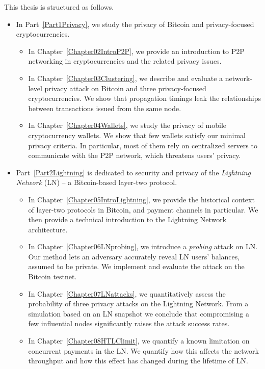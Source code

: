 This thesis is structured as follows.

\begin{itemize}
	\item 
	In Part~\ref{Part1Privacy}, we study the privacy of Bitcoin and privacy-focused cryptocurrencies.
	\begin{itemize}
		\item
	In Chapter~\ref{Chapter02IntroP2P}, we provide an introduction to P2P networking in cryptocurrencies and the related privacy issues.
		\item
	In Chapter~\ref{Chapter03Clustering}, we describe and evaluate a network-level privacy attack on Bitcoin and three privacy-focused cryptocurrencies.
	We show that propagation timings leak the relationships between transactions issued from the same node.
		\item
	In Chapter~\ref{Chapter04Wallets}, we study the privacy of mobile cryptocurrency wallets.
	We show that few wallets satisfy our minimal privacy criteria.
	In particular, most of them rely on centralized servers to communicate with the P2P network, which threatens users' privacy.
	\end{itemize}

	\item
	Part~\ref{Part2Lightning} is dedicated to security and privacy of the \textit{Lightning Network} (LN) -- a Bitcoin-based layer-two protocol.
	\begin{itemize}
		\item 
	In Chapter~\ref{Chapter05IntroLightning}, we provide the historical context of layer-two protocols in Bitcoin, and payment channels in particular.
	We then provide a technical introduction to the Lightning Network architecture.
		\item
	In Chapter~\ref{Chapter06LNprobing}, we introduce a \textit{probing} attack on LN\@.
	Our method lets an adversary accurately reveal LN users' balances, assumed to be private.
	We implement and evaluate the attack on the Bitcoin testnet.
		\item
	In Chapter~\ref{Chapter07LNattacks}, we quantitatively assess the probability of three privacy attacks on the Lightning Network.
	From a simulation based on an LN snapshot we conclude that compromising a few influential nodes significantly raises the attack success rates.
		\item
	In Chapter~\ref{Chapter08HTLClimit}, we quantify a known limitation on concurrent payments in the LN\@.
	We quantify how this affects the network throughput and how this effect has changed during the lifetime of LN\@.
	\end{itemize}


\end{itemize}
